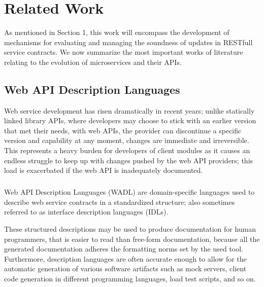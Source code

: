 
%

\chapter{Related Work}
\label{cha:related_work}

As mentioned in Section 1, this work will encompass the development of
mechanisms for evaluating and managing the soundness of updates in RESTfull \cite{feng2009rest} service contracts.
We now summarize the most important works of literature relating to the evolution of microservices and their APIs.

\section{Web API Description Languages} %
\label{sec:web_api_description_languages}

Web service development has risen dramatically in recent years;  unlike statically linked library APIs,
where developers may choose to stick with an earlier version that met their needs, with web APIs,
the provider can discontinue a specific version and capability at any moment, changes are immediate and irreversible.
This represents a heavy burden for developers of client modules as it causes an endless struggle to keep up
with changes pushed by the web API providers; this load is exacerbated if the web API is inadequately documented.

\paragraph{}

Web API Description Languages (WADL) are domain-specific languages used to describe web service contracts in a standardized structure;
also sometimes referred to as interface description languages (IDLs).

These structured descriptions may be used to produce documentation for human programmers, that is easier to read than free-form documentation,
because all the generated documentation adheres the formatting norms set by the used tool.
Furthermore, description languages are often accurate enough to allow for the automatic generation of various software artifacts such as mock servers,
client code generation in different programming languages, load test scripts, and so on.

